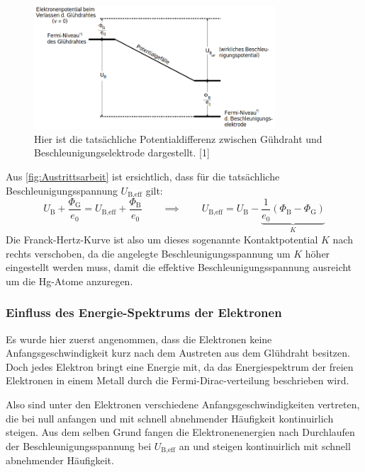 \documentclass[titlepage = firstcover]{scrartcl}
\begin{document}
                \begin{figure}[h]
                    \centering
                    \includegraphics[width = 0.8\textwidth]{Bilder/Austrittsarbeit.png}
                    \caption{Hier ist die tatsächliche Potentialdifferenz zwischen Gühdraht und Beschleunigungselektrode dargestellt. [1]}
                    \label{fig:Austrittsarbeit}
                \end{figure}

                \FloatBarrier

                Aus \autoref{fig:Austrittsarbeit} ist ersichtlich, dass für die tatsächliche Beschleunigungsspannung $U_{\text{B,eff}}$ gilt:
                \begin{equation*}
                    U_{\text{B}} + \frac{\Phi_{\text{G}}}{e_0} = U_{\text{B,eff}} + \frac{\Phi_{\text{B}}}{e_0} \qquad \implies \qquad U_{\text{B,eff}} = U_{\text{B}} - \underbrace{\frac{1}{e_0}(\Phi_{\text{B}} - \Phi_{\text{G}})}_{K}
                \end{equation*}
                Die Franck-Hertz-Kurve ist also um dieses sogenannte Kontaktpotential $K$ nach rechts verschoben, da die angelegte Beschleunigungsspannung um $K$ höher eingestellt werden muss, damit die effektive Beschleunigungsspannung ausreicht um die Hg-Atome anzuregen.

            \subsubsection{Einfluss des Energie-Spektrums der Elektronen}
                Es wurde hier zuerst angenommen, dass die Elektronen keine Anfangsgeschwindigkeit kurz nach dem Austreten aus dem Glühdraht besitzen. Doch jedes Elektron bringt eine Energie mit, da das Energiespektrum der freien Elektronen in einem Metall durch die Fermi-Dirac-verteilung beschrieben wird.

                Also sind unter den Elektronen verschiedene Anfangsgeschwindigkeiten vertreten, die bei null anfangen und mit schnell abnehmender Häufigkeit kontinuirlich steigen. Aus dem selben Grund fangen die Elektronenenergien nach Durchlaufen der Beschleunigungsspannung bei $U_{\text{B,eff}}$ an und steigen kontinuirlich mit schnell abnehmender Häufigkeit. \\
\end{document}
